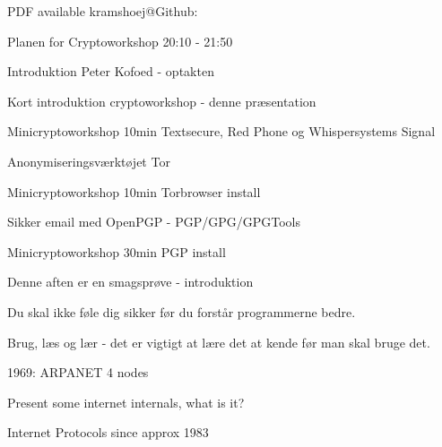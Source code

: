 \documentclass[20pt,landscape,a4paper,footrule]{foils}
\begin{document}

\centerline{\footnotesize PDF available kramshoej@Github: \jobname}


Planen for Cryptoworkshop 20:10 - 21:50
\begin{list2}
\item Introduktion Peter Kofoed - optakten
\item Kort introduktion cryptoworkshop - denne præsentation
\item Minicryptoworkshop 10min Textsecure, Red Phone og Whispersystems Signal
\item Anonymiseringsværktøjet Tor
\item Minicryptoworkshop 10min Torbrowser install
\item Sikker email med OpenPGP - PGP/GPG/GPGTools
\item Minicryptoworkshop 30min PGP install

\end{list2}




\begin{center}
Denne aften er en smagsprøve - introduktion

Du skal ikke føle dig sikker før du forstår programmerne bedre.

Brug, læs og lær - det er vigtigt at lære det at kende før man skal bruge det.
\end{center}




\centerline{1969: ARPANET 4 nodes}


\begin{list1}
\item Present some internet internals, what is it?
\end{list1}


\vskip 1cm
\centerline{Internet Protocols since approx 1983}
\end{document}
